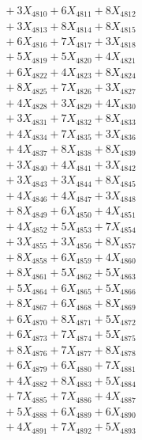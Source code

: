 \documentclass[a4paper,10pt]{article}
\begin{document}
{\begin{align}
&\;  + 3 X_{4810} + 6 X_{4811} + 8 X_{4812} \\[0.3ex]
&\;  + 3 X_{4813} + 8 X_{4814} + 8 X_{4815} \\[0.3ex]
&\;  + 6 X_{4816} + 7 X_{4817} + 3 X_{4818} \\[0.3ex]
&\;  + 5 X_{4819} + 5 X_{4820} + 4 X_{4821} \\[0.3ex]
&\;  + 6 X_{4822} + 4 X_{4823} + 8 X_{4824} \\[0.3ex]
&\;  + 8 X_{4825} + 7 X_{4826} + 3 X_{4827} \\[0.3ex]
&\;  + 4 X_{4828} + 3 X_{4829} + 4 X_{4830} \\[0.3ex]
&\;  + 3 X_{4831} + 7 X_{4832} + 8 X_{4833} \\[0.3ex]
&\;  + 4 X_{4834} + 7 X_{4835} + 3 X_{4836} \\[0.3ex]
&\;  + 4 X_{4837} + 8 X_{4838} + 8 X_{4839} \\[0.5ex]\allowbreak
&\;  + 3 X_{4840} + 4 X_{4841} + 3 X_{4842} \\[0.3ex]
&\;  + 3 X_{4843} + 3 X_{4844} + 8 X_{4845} \\[0.3ex]
&\;  + 4 X_{4846} + 4 X_{4847} + 3 X_{4848} \\[0.3ex]
&\;  + 8 X_{4849} + 6 X_{4850} + 4 X_{4851} \\[0.3ex]
&\;  + 4 X_{4852} + 5 X_{4853} + 7 X_{4854} \\[0.3ex]
&\;  + 3 X_{4855} + 3 X_{4856} + 8 X_{4857} \\[0.3ex]
&\;  + 8 X_{4858} + 6 X_{4859} + 4 X_{4860} \\[0.3ex]
&\;  + 8 X_{4861} + 5 X_{4862} + 5 X_{4863} \\[0.3ex]
&\;  + 5 X_{4864} + 6 X_{4865} + 5 X_{4866} \\[0.3ex]
&\;  + 8 X_{4867} + 6 X_{4868} + 8 X_{4869} \\[0.5ex]\allowbreak
&\;  + 6 X_{4870} + 8 X_{4871} + 5 X_{4872} \\[0.3ex]
&\;  + 6 X_{4873} + 7 X_{4874} + 5 X_{4875} \\[0.3ex]
&\;  + 8 X_{4876} + 7 X_{4877} + 8 X_{4878} \\[0.3ex]
&\;  + 6 X_{4879} + 6 X_{4880} + 7 X_{4881} \\[0.3ex]
&\;  + 4 X_{4882} + 8 X_{4883} + 5 X_{4884} \\[0.3ex]
&\;  + 7 X_{4885} + 7 X_{4886} + 4 X_{4887} \\[0.3ex]
&\;  + 5 X_{4888} + 6 X_{4889} + 6 X_{4890} \\[0.3ex]
&\;  + 4 X_{4891} + 7 X_{4892} + 5 X_{4893} \\[0.3ex]

\end{align}}
\end{document}
